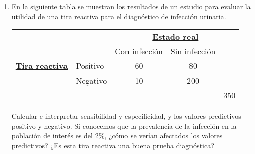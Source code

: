 \documentclass[10pt,a4paper]{article}
\begin{document}
\begin{enumerate}
\item En la siguiente tabla se muestran los resultados de un estudio para evaluar la utilidad de una tira reactiva para el diagnóstico de infección urinaria.
        \begin{center}
            \begin{tabular}{llccc}
            &&\multicolumn{3}{c}{\underline{\bf Estado real}}\\

                                  &          & Con infección& Sin infección&\\
            \hline
            \underline{\bf Tira reactiva}     & Positivo & 60  & 80 &   \\
                                             & Negativo & 10  & 200 &   \\
            \hline
                                              &          &     &     & 350  \\
            \hline
            \end{tabular}
        \end{center}
        Calcular e interpretar sensibilidad y especificidad, y los valores predictivos positivo y negativo. Si conocemos que la prevalencia de la infección en la población de interés es del 2\%, ¿cómo se verían afectados los valores predictivos? ¿Es esta tira reactiva una buena prueba diagnóstica?

\end{enumerate}
\end{document}
